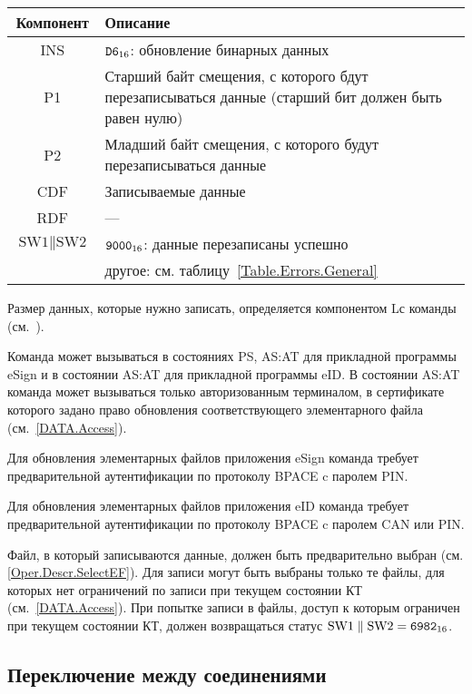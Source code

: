 \begin{table}[hbt]
\caption{}\label{Table.Oper.UpdateCmd}
\begin{tabular}{|c|p{14cm}|}
\hline
Компонент & Описание\\
\hline
\hline
INS & $\texttt{D6}_{16}$: обновление бинарных данных\\
\hline
P1 & Старший байт смещения, с которого бдут перезаписываться данные 
(старший бит должен быть равен нулю) \\
\hline
P2 & Младший байт смещения, с которого будут перезаписываться данные \\
\hline
CDF & Записываемые данные \\
\hline 
RDF &  --- \\
\hline
$\text{SW1} \parallel \text{SW2}$ & 
$\texttt{9000}_{16}$: данные перезаписаны успешно \\
 & другое: см. таблицу~\ref{Table.Errors.General} \\
\hline
\end{tabular}
\end{table}

Размер данных, которые нужно записать, определяется компонентом Lс команды 
(см.~\cite{APDU}).

Команда может вызываться в состояниях PS, AS:AT 
для прикладной программы eSign и в состоянии 
AS:AT для прикладной программы eID.
В состоянии AS:AT команда может вызываться только 
авторизованным терминалом, в сертификате которого
задано право обновления соответствующего 
элементарного файла (см.~\ref{DATA.Access}).

Для обновления элементарных файлов приложения eSign команда требует 
предварительной аутентификации по протоколу BPACE c 
паролем PIN.

Для обновления элементарных файлов приложения eID команда требует 
предварительной аутентификации по протоколу BPACE c 
паролем CAN или PIN.

Файл, в который записываются данные, должен быть предварительно
выбран (см. \ref{Oper.Descr.SelectEF}).
Для записи могут быть выбраны только те файлы, для которых 
нет ограничений по записи при текущем состоянии КТ (см.~\ref{DATA.Access}). 
При попытке записи в файлы, доступ к которым ограничен при текущем состоянии КТ, 
должен возвращаться статус $\text{SW1} \parallel\text{SW2} = \texttt{6982}_{16}$. 


\subsection{Переключение между соединениями}
\label{Oper.Descr.SetCS}

